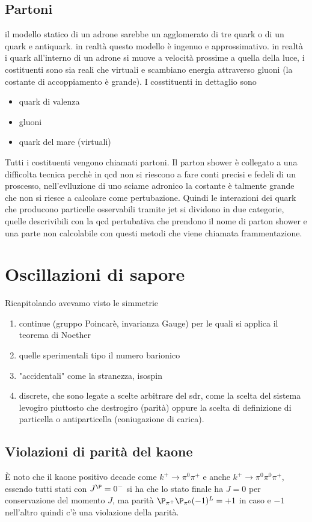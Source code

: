 \documentclass[12pt]{book}
\begin{document}
\section{Partoni}
il modello statico di un adrone sarebbe un agglomerato di tre quark o di un quark e antiquark. in realtà questo modello è ingenuo e approssimativo. in realtà i quark all'interno di un adrone si muove a velocità prossime a quella della luce, i costituenti sono sia reali che virtuali e scambiano energia attraverso gluoni (la costante di accoppiamento è grande). I cosstituenti in dettaglio sono 
\begin{itemize}
	\item quark di valenza
	\item gluoni
	\item quark del mare (virtuali)
\end{itemize}
Tutti i costituenti vengono chiamati partoni. Il parton shower è collegato a una difficolta tecnica perchè in qcd non si riescono a fare conti precisi e fedeli di un proscesso, nell'evlluzione di uno sciame adronico la costante è talmente grande che non si riesce a calcolare come pertubazione. Quindi le interazioni dei quark che producono particelle osservabili tramite jet si dividono in due categorie, quelle descrivibili con la qcd pertubativa che prendono il nome di parton shower e una parte non calcolabile con questi metodi che viene chiamata frammentazione.


\chapter{Oscillazioni di sapore}
Ricapitolando avevamo visto le simmetrie
\begin{enumerate}
	\item continue (gruppo Poincarè, invarianza Gauge) per le quali si applica il teorema di Noether
	\item quelle sperimentali tipo il numero barionico
	\item "accidentali" come la stranezza, isospin
	\item discrete, che sono legate a scelte arbitrare del sdr, come la scelta del sistema levogiro piuttosto che destrogiro (parità) oppure la scelta di definizione di particella o antiparticella (coniugazione di carica).
\end{enumerate}

\section{Violazioni di parità del kaone}
È noto che il kaone positivo decade come $k^+ \rightarrow \pi^0 \pi^+$ e anche $k^+ \rightarrow \pi^0 \pi^0 \pi^+$, essendo tutti stati con $J^\P=0^-$ si ha che lo stato finale ha $J=0$ per conservazione del momento $J$, ma parità $\P_{\pi^+} \P_{\pi^0} (-1)^L=+1$ in caso e $-1$ nell'altro quindi c'è una violazione della parità.
\end{document}
